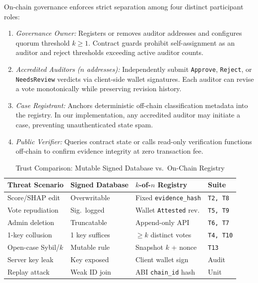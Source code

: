 \documentclass[conference]{IEEEtran}
\begin{document}
On-chain governance enforces strict separation among four distinct participant roles:
\begin{enumerate}
\item \emph{Governance Owner:} Registers or removes auditor addresses and configures quorum threshold $k \ge 1$. Contract guards prohibit self-assignment as an auditor and reject thresholds exceeding active auditor counts.
\item \emph{Accredited Auditors ($n$ addresses):} Independently submit \texttt{Approve}, \texttt{Reject}, or \texttt{NeedsReview} verdicts via client-side wallet signatures. Each auditor can revise a vote monotonically while preserving revision history.
\item \emph{Case Registrant:} Anchors deterministic off-chain classification metadata into the registry. In our implementation, any accredited auditor may initiate a case, preventing unauthenticated state spam.
\item \emph{Public Verifier:} Queries contract state or calls read-only verification functions off-chain to confirm evidence integrity at zero transaction fee.
\end{enumerate}

\begin{table}[t]
\centering
\caption{Trust Comparison: Mutable Signed Database vs.\ On-Chain Registry}
\label{tab:threat_summary}
\footnotesize
\setlength{\tabcolsep}{3pt}
\begin{tabular}{@{}llll@{}}
\toprule
Threat Scenario & Signed Database & $k$-of-$n$ Registry & Suite \\
\midrule
Score/SHAP edit & Overwritable & Fixed \texttt{evidence\_hash} & \texttt{T2, T8} \\
Vote repudiation & Sig.\ logged & Wallet \texttt{Attested} rev. & \texttt{T5, T9} \\
Admin deletion & Truncatable & Append-only API & \texttt{T6, T7} \\
1-key collusion & 1 key suffices & $\ge k$ distinct votes & \texttt{T4, T10} \\
Open-case Sybil/$k$ & Mutable rule & Snapshot $k$ + nonce & \texttt{T13} \\
Server key leak & Key exposed & Client wallet sign & Audit \\
Replay attack & Weak ID join & ABI \texttt{chain\_id} hash & Unit \\
\bottomrule
\end{tabular}
\end{table}
\end{document}
